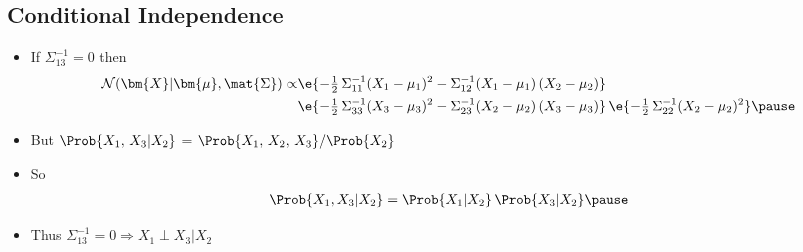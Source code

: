 \begin{slide}
\section{Conditional Independence}

\begin{PauseHighLight}
  \begin{itemize}
  \item If $\Sigma^{-1}_{13}=0$ then
    \begin{align*}
      \mathcal{N}(\bm{X}|\bm{\mu}, \mat{\Sigma})
      \propto& \e{-\tfrac{1}{2}\,\Sigma^{-1}_{11}
      (X_1-\mu_1)^2 - \Sigma^{-1}_{12} (X_1-\mu_1)\,(X_2-\mu_2)} \\
      & \e{-\tfrac{1}{2}\,\Sigma^{-1}_{33}
      (X_3-\mu_3)^2 - \Sigma^{-1}_{23} (X_2-\mu_2)\,(X_3-\mu_3)} 
      \, \e{-\tfrac{1}{2}\,\Sigma^{-1}_{22} (X_2-\mu_2)^2}\pause
    \end{align*}
  \item But $\Prob{X_1,\,X_3|X_2}$ = $\Prob{X_1,\,X_2,\,X_3}/\Prob{X_2}$
  \item So
    \begin{align*}
      \Prob{X_1,X_3|X_2} = \Prob{X_1|X_2}\,\Prob{X_3|X_2}\pause
    \end{align*}
  \item Thus $\Sigma^{-1}_{13}=0 \Rightarrow X_1 \perp X_3 | X_2$\pause
  \end{itemize}
\end{PauseHighLight}

\end{slide}


